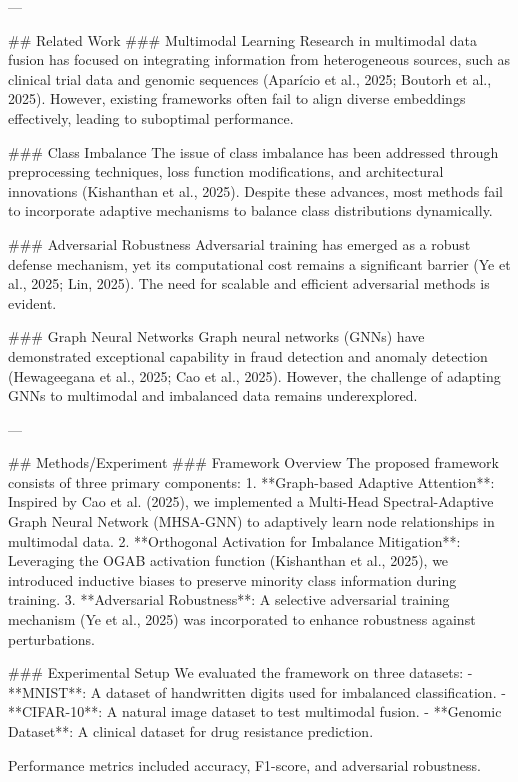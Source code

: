 ---

## Related Work
### Multimodal Learning
Research in multimodal data fusion has focused on integrating information from heterogeneous sources, such as clinical trial data and genomic sequences (Aparício et al., 2025; Boutorh et al., 2025). However, existing frameworks often fail to align diverse embeddings effectively, leading to suboptimal performance.

### Class Imbalance
The issue of class imbalance has been addressed through preprocessing techniques, loss function modifications, and architectural innovations (Kishanthan et al., 2025). Despite these advances, most methods fail to incorporate adaptive mechanisms to balance class distributions dynamically.

### Adversarial Robustness
Adversarial training has emerged as a robust defense mechanism, yet its computational cost remains a significant barrier (Ye et al., 2025; Lin, 2025). The need for scalable and efficient adversarial methods is evident.

### Graph Neural Networks
Graph neural networks (GNNs) have demonstrated exceptional capability in fraud detection and anomaly detection (Hewageegana et al., 2025; Cao et al., 2025). However, the challenge of adapting GNNs to multimodal and imbalanced data remains underexplored.

---

## Methods/Experiment
### Framework Overview
The proposed framework consists of three primary components:
1. **Graph-based Adaptive Attention**: Inspired by Cao et al. (2025), we implemented a Multi-Head Spectral-Adaptive Graph Neural Network (MHSA-GNN) to adaptively learn node relationships in multimodal data.
2. **Orthogonal Activation for Imbalance Mitigation**: Leveraging the OGAB activation function (Kishanthan et al., 2025), we introduced inductive biases to preserve minority class information during training.
3. **Adversarial Robustness**: A selective adversarial training mechanism (Ye et al., 2025) was incorporated to enhance robustness against perturbations.

### Experimental Setup
We evaluated the framework on three datasets:
- **MNIST**: A dataset of handwritten digits used for imbalanced classification.
- **CIFAR-10**: A natural image dataset to test multimodal fusion.
- **Genomic Dataset**: A clinical dataset for drug resistance prediction.

Performance metrics included accuracy, F1-score, and adversarial robustness.

